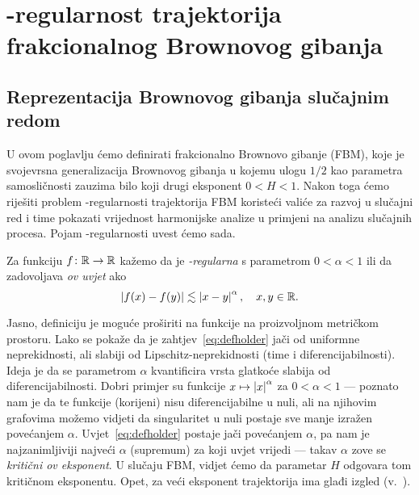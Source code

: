 \documentclass[main.tex]{subfiles}
\begin{document}
\nocite{*}

\chapter[\holder -regularnost trajektorija FBM]{\holder -regularnost trajektorija frakcionalnog Brownovog gibanja}\label{chapter-gl}
\section{Reprezentacija Brownovog gibanja slučajnim redom}\label{sec:gl-brown}
U ovom poglavlju ćemo definirati frakcionalno Brownovo gibanje (FBM), koje je svojevrsna generalizacija
Brownovog gibanja u kojemu ulogu \( 1/2 \) kao parametra samosličnosti zauzima bilo koji drugi
eksponent \( 0 < H < 1 \). Nakon toga ćemo riješiti problem \holder -regularnosti trajektorija FBM
koristeći valiće za razvoj u slučajni red i time pokazati vrijednost harmonijske analize
u primjeni na analizu slučajnih procesa. Pojam \holder -regularnosti uvest ćemo sada.

\begin{definicija}\label{def:holderf}
	Za funkciju \( f \colon \mathbb{R} \to \mathbb{R} \) kažemo da je \emph{\holder -regularna} s parametrom
	\( 0 < \alpha < 1 \) ili da zadovoljava \emph{\holder ov uvjet} ako
	\begin{equation} \label{eq:defholder}
		\left| {f(x)-f(y)} \right| \lesssim \left| {x-y} \right|^\alpha, \quad x,y \in \mathbb{R}.
	\end{equation}
\end{definicija}

Jasno, definiciju je moguće proširiti na funkcije na proizvoljnom metričkom prostoru.
Lako se pokaže da je zahtjev~\eqref{eq:defholder} jači od uniformne neprekidnosti,
ali slabiji od Lipschitz-neprekidnosti (time i diferencijabilnosti). Ideja je da se parametrom
\( \alpha \) kvantificira vrsta glatkoće slabija od diferencijabilnosti. Dobri primjer su funkcije
\( x \mapsto \left| {x} \right| ^\alpha \) za \( 0 < \alpha < 1 \) --- poznato nam je da te funkcije (korijeni)
nisu diferencijabilne u nuli, ali na njihovim grafovima možemo vidjeti da singularitet u nuli
postaje sve manje izražen povećanjem \( \alpha \). Uvjet~\eqref{eq:defholder} postaje
jači povećanjem \( \alpha \), pa nam je najzanimljiviji najveći \( \alpha \) (supremum) za koji uvjet vrijedi --- takav
\( \alpha \) zove se \emph{kritični \holder ov eksponent}. U slučaju
FBM, vidjet ćemo da parametar \( H \) odgovara tom kritičnom eksponentu. Opet,
za veći eksponent trajektorija ima glađi izgled (v.~\cite[str.~6]{se}).
\end{document}
